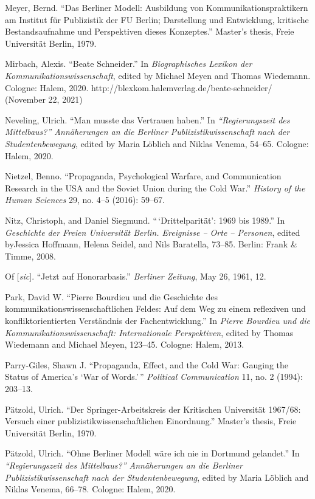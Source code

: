 \documentclass{tufte-handout}
\begin{document}
\begin{hangparas}{.25in}{1}
Meyer, Bernd. ``Das Berliner Modell: Ausbildung von
Kommunikationspraktikern am Institut für Publizistik der FU Berlin;
Darstellung und Entwicklung, kritische Bestandsaufnahme und Perspektiven
dieses Konzeptes.'' Master's thesis, Freie Universität Berlin, 1979.

Mirbach, Alexis. ``Beate Schneider.'' In \emph{Biographisches Lexikon
der Kommunikationswissenschaft}, edited by Michael Meyen and Thomas
Wiedemann. Cologne: Halem, 2020.
http://blexkom.halemverlag.de/beate-schneider/ (November 22, 2021)

Neveling, Ulrich. ``Man musste das Vertrauen haben.'' In
\emph{``Regierungszeit des Mittelbaus?'' Annäherungen an die Berliner
Publizistikwissenschaft nach der Studentenbewegung}, edited by Maria
Löblich and Niklas Venema, 54--65. Cologne: Halem, 2020.

Nietzel, Benno. ``Propaganda, Psychological Warfare, and Communication
Research in the USA and the Soviet Union during the Cold War.''
\emph{History of the Human Sciences} 29, no. 4--5 (2016): 59--67.

Nitz, Christoph, and Daniel Siegmund. ``\,`Drittelparität': 1969 bis
1989.'' In \emph{Geschichte der Freien Universität Berlin. Ereignisse --
Orte -- Personen}, edited byJessica Hoffmann, Helena Seidel, and Nils
Baratella, 73--85. Berlin: Frank \& Timme, 2008.

Of {[}\emph{sic}{]}. ``Jetzt auf Honorarbasis.'' \emph{Berliner
Zeitung}, May 26, 1961, 12.

Park, David W. ``Pierre Bourdieu und die Geschichte des
kommunikationswissenschaftlichen Feldes: Auf dem Weg zu einem reflexiven
und konfliktorientierten Verständnis der Fachentwicklung.'' In
\emph{Pierre Bourdieu und die Kommunikationswissenschaft: Internationale
Perspektiven}, edited by Thomas Wiedemann and Michael Meyen, 123--45.
Cologne: Halem, 2013.

Parry-Giles, Shawn J. ``Propaganda, Effect, and the Cold War: Gauging
the Status of America's `War of Words.'\,'' \emph{Political
Communication} 11, no. 2 (1994): 203­--13.

Pätzold, Ulrich. ``Der Springer-Arbeitskreis der Kritischen Universität
1967/68: Versuch einer publizistikwissenschaftlichen Einordnung.''
Master's thesis, Freie Universität Berlin, 1970.

Pätzold, Ulrich. ``Ohne Berliner Modell wäre ich nie in Dortmund
gelandet.'' In \emph{``Regierungszeit des Mittelbaus?'' Annäherungen an
die Berliner Publizistikwissenschaft nach der Studentenbewegung}, edited
by Maria Löblich and Niklas Venema, 66--78. Cologne: Halem, 2020.


\end{hangparas}
\end{document}
